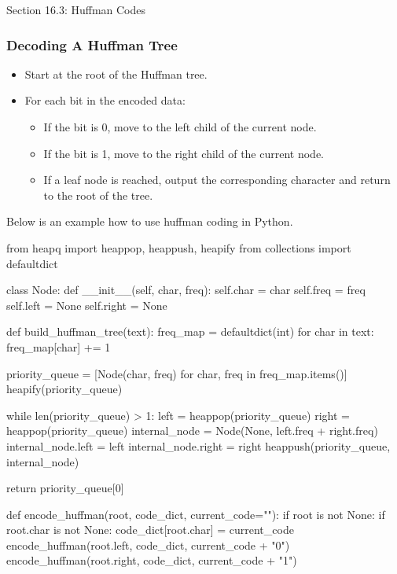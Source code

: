 \begin{notes}{Section 16.3: Huffman Codes}
    \subsubsection*{Decoding A Huffman Tree}
    \begin{itemize}
        \item Start at the root of the Huffman tree.
        \item For each bit in the encoded data:
        \begin{itemize}
            \item If the bit is 0, move to the left child of the current node.
            \item If the bit is 1, move to the right child of the current node.
            \item If a leaf node is reached, output the corresponding character and return to the root of the tree.
        \end{itemize}
    \end{itemize}
    
    \begin{highlight}
        Below is an example how to use huffman coding in Python.
    \begin{code}[Python]
    from heapq import heappop, heappush, heapify
    from collections import defaultdict
    
    class Node:
        def __init__(self, char, freq):
            self.char = char
            self.freq = freq
            self.left = None
            self.right = None
    
    def build_huffman_tree(text):
        freq_map = defaultdict(int)
        for char in text:
            freq_map[char] += 1
    
        priority_queue = [Node(char, freq) for char, freq in freq_map.items()]
        heapify(priority_queue)
    
        while len(priority_queue) > 1:
            left = heappop(priority_queue)
            right = heappop(priority_queue)
            internal_node = Node(None, left.freq + right.freq)
            internal_node.left = left
            internal_node.right = right
            heappush(priority_queue, internal_node)
    
        return priority_queue[0]
    
    def encode_huffman(root, code_dict, current_code=""):
        if root is not None:
            if root.char is not None:
                code_dict[root.char] = current_code
            encode_huffman(root.left, code_dict, current_code + "0")
            encode_huffman(root.right, code_dict, current_code + "1")
    

\end{code}
\end{highlight}
\end{notes}

